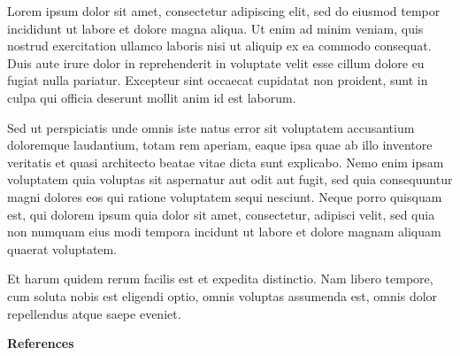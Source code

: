 \documentclass[12pt,letterpaper]{article}
\begin{document}
Lorem ipsum dolor sit amet, consectetur adipiscing elit, sed do eiusmod tempor incididunt ut labore et dolore magna aliqua. Ut enim ad minim veniam, quis nostrud exercitation ullamco laboris nisi ut aliquip ex ea commodo consequat. Duis aute irure dolor in reprehenderit in voluptate velit esse cillum dolore eu fugiat nulla pariatur. Excepteur sint occaecat cupidatat non proident, sunt in culpa qui officia deserunt mollit anim id est laborum.

Sed ut perspiciatis unde omnis iste natus error sit voluptatem accusantium doloremque laudantium, totam rem aperiam, eaque ipsa quae ab illo inventore veritatis et quasi architecto beatae vitae dicta sunt explicabo. Nemo enim ipsam voluptatem quia voluptas sit aspernatur aut odit aut fugit, sed quia consequuntur magni dolores eos qui ratione voluptatem sequi nesciunt. Neque porro quisquam est, qui dolorem ipsum quia dolor sit amet, consectetur, adipisci velit, sed quia non numquam eius modi tempora incidunt ut labore et dolore magnam aliquam quaerat voluptatem.

Et harum quidem rerum facilis est et expedita distinctio. Nam libero tempore, cum soluta nobis est eligendi optio, omnis voluptas assumenda est, omnis dolor repellendus atque saepe eveniet.

\vspace{2.5pt}
\noindent\textbf{References}\enspace
{\fontsize{10pt}{10.35pt}\selectfont
\setlength{\parskip}{0pt}
\printbibliography[heading=none,env=inlinebibliography]
}
\end{document}
